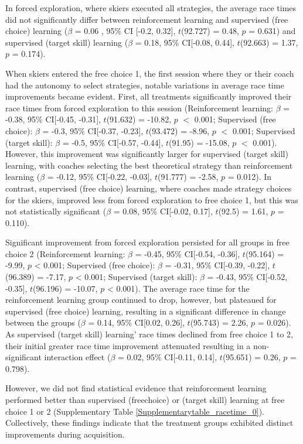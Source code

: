 \documentclass{article}
\begin{document}
In forced exploration, where skiers executed all strategies, the average race times did not significantly differ between reinforcement learning and supervised (free choice) learning ($\beta$ = 0.06 , 95\% CI [-0.2, 0.32], $t$(92.727) = 0.48, $p$ = 0.631) and supervised (target skill) learning ($\beta$ = 0.18, 95\% CI[-0.08, 0.44], $t$(92.663) = 1.37, $p$ = 0.174). 

When skiers entered the free choice 1, the first session where they or their coach had the autonomy to select strategies, notable variations in average race time improvements became evident. First, all treatments significantly improved their race times from forced exploration to this session (Reinforcement learning: $\beta$ = -0.38, 95\% CI[-0.45, -0.31], $t$(91.632) = -10.82, $p$ $<$ 0.001; Supervised (free choice): $\beta$ = -0.3, 95\% CI[-0.37, -0.23], $t$(93.472) = -8.96, $p$ $<$ 0.001; Supervised (target skill): $\beta$ = -0.5, 95\% CI[-0.57, -0.44], $t$(91.95) = -15.08, $p$ $<$ 0.001). However, this improvement was significantly larger for supervised (target skill) learning, with coaches selecting the best theoretical strategy than reinforcement learning ($\beta$ = -0.12, 95\% CI[-0.22, -0.03], $t$(91.777) = -2.58, $p$ = 0.012). In contrast, supervised (free choice) learning, where coaches made strategy choices for the skiers, improved less from forced exploration to free choice 1, but this was not statistically significant ($\beta$ = 0.08, 95\% CI[-0.02, 0.17], $t$(92.5) = 1.61, $p$ = 0.110).

Significant improvement from forced exploration persisted for all groups in free choice 2 (Reinforcement learning: $\beta$ = -0.45, 95\% CI[-0.54, -0.36], $t$(95.164) = -9.99, $p$ < 0.001; Supervised (free choice): $\beta$ = -0.31, 95\% CI[-0.39, -0.22], $t$(96.389) = -7.17, $p$ < 0.001; Supervised (target skill): $\beta$ = -0.43, 95\% CI[-0.52, -0.35], $t$(96.196) = -10.07, $p$ < 0.001). The average race time for the reinforcement learning group continued to drop, however, but plateaued for supervised (free choice) learning, resulting in a significant difference in change between the groups ($\beta$ = 0.14, 95\% CI[0.02, 0.26], $t$(95.743) = 2.26, $p$ = 0.026). As supervised (target skill) learning' race times declined from free choice 1 to 2, their initial greater race time improvement attenuated resulting in a non-significant interaction effect ($\beta$ = 0.02, 95\% CI[-0.11, 0.14], $t$(95.651) = 0.26, $p$ = 0.798).

However, we did not find statistical evidence that reinforcement learning performed better than supervised (freechoice) or (target skill) learning at free choice 1 or 2 (Supplementary Table \ref{Supplementarytable_racetime_0}).
Collectively, these findings indicate that the treatment groups exhibited distinct improvements during acquisition.
\end{document}
